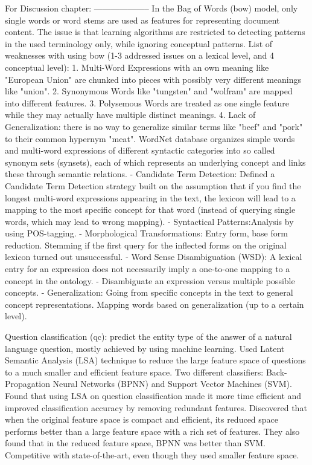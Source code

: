 For Discussion chapter:
--------------------
In the Bag of Words (bow) model, only single words or word stems are used as features for representing document content. The issue is that learning algorithms are restricted to detecting patterns in the used terminology only, while ignoring conceptual patterns. List of weaknesses with using bow (1-3 addressed issues on a lexical level, and 4 conceptual level):
1.	Multi-Word Expressions with an own meaning like "European Union" are chunked into pieces with possibly very different meanings like "union".
2.	Synonymous Words like "tungsten" and "wolfram" are mapped into different features.
3.	Polysemous Words are treated as one single feature while they may actually have multiple distinct meanings.
4.	Lack of Generalization: there is no way to generalize similar terms like "beef" and "pork" to their common hypernym "meat".
WordNet database organizes simple words and multi-word expressions of different syntactic categories into so called synonym sets (synsets), each of which represents an underlying concept and links these through semantic relations.
-	Candidate Term Detection: Defined a Candidate Term Detection strategy built on the assumption that if you find the longest multi-word expressions appearing in the text, the lexicon will lead to a mapping to the most specific concept for that word (instead of querying single words, which may lead to wrong mapping).
-	Syntactical Patterns:Analysis by using POS-tagging.
-	Morphological Transformations: Entry form, base form reduction. Stemming if the first query for the inflected forms on the original lexicon turned out unsuccessful.
-	Word Sense Disambiguation (WSD): A lexical entry for an expression does not necessarily imply a one-to-one mapping to a concept in the ontology. 
-	Disambiguate an expression versus multiple possible concepts.
-	Generalization: Going from specific concepts in the text to general concept representations. Mapping words based on generalization (up to a certain level).
\cite{Bloehdorn2004}

Question classification (qc): predict the entity type of the answer of a natural language question, mostly achieved by using machine learning. Used Latent Semantic Analysis (LSA) technique to reduce the large feature space of questions to a much smaller and efficient feature space. Two different classifiers: Back-Propagation Neural Networks (BPNN) and Support Vector Machines (SVM). Found that using LSA on question classification made it more time efficient and improved classification accuracy by removing redundant features. Discovered that when the original feature space is compact and efficient, its reduced space performs better than a large feature space with a rich set of features. They also found that in the reduced feature space, BPNN was better than SVM.  Competitive with state-of-the-art, even though they used smaller feature space.
\cite{Loni2011}

